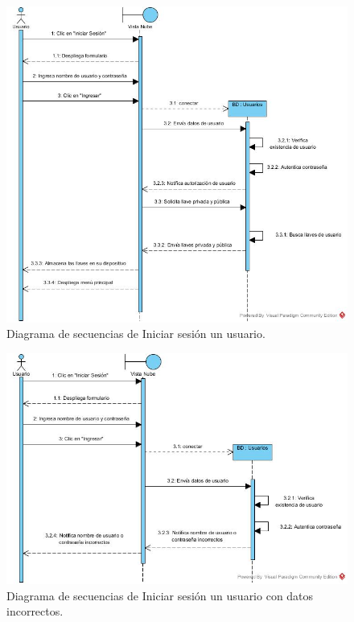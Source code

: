 \begin{figure}[htbp!]
\centering
\includegraphics[width=1\textwidth]{images/Iniciar_sesion}
\caption{Diagrama de secuencias de Iniciar sesión un usuario.}
\end{figure}

\begin{figure}[htbp!]
\centering
\includegraphics[width=1\textwidth]{images/Iniciar_trayectoria_a}
\caption{Diagrama de secuencias de Iniciar sesión un usuario con datos incorrectos.}
\end{figure}

